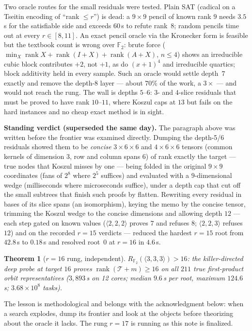 \documentclass[11pt]{article}
\newtheorem{theorem}{Theorem}
\theoremstyle{definition}
\newcommand{\F}{\mathbb{F}_2}
\newcommand{\T}{\mathcal{T}}
\newcommand{\rk}{\operatorname{rank}}
\begin{document}
Two oracle routes for the small residuals were tested. Plain SAT
(cadical on a Tseitin encoding of ``rank $\le r$'') is dead: a $9\times 9$
pencil of known rank $9$ needs $3.5$\,s for the satisfiable side and
exceeds $60$\,s to refute rank~$8$; random pencils time out at every
$r\in[8,11]$. An exact pencil oracle via the Kronecker form is feasible
but the textbook count is wrong over $\F$: brute force
($\min_X \rk X + \rk(I{+}X) + \rk(A{+}X)$, $n\le 4$) shows an irreducible
cubic block contributes $+2$, not $+1$, as do $(x+1)^4$ and irreducible
quartics; block additivity held in every sample. Such an oracle would
settle depth~$7$ exactly and remove the depth-$8$ layer --- about $70\%$
of the work, a $3\times$ --- and would not reach the rung. The wall is
depths $5$--$6$: $3$- and $4$-slice residuals that must be proved to have
rank $10$--$11$, where Koszul caps at $13$ but fails on the hard
instances and no cheap exact method is in sight.

\textbf{Standing verdict (superseded the same day).} The paragraph
above was written before the frontier was examined directly. Dumping
the depth-5/6 residuals showed them to be \emph{concise} $3\times 6\times 6$
and $4\times 6\times 6$ tensors (common kernels of dimension $3$, row and
column spans $6$) of rank exactly the target --- true nodes that Koszul
misses by one --- being folded in the original $9\times 9$ coordinates
(fans of $2^8$ where $2^5$ suffices) and evaluated with a $9$-dimensional
wedge (milliseconds where microseconds suffice), under a depth cap that
cut off the small subtrees that finish such proofs by flatten. Rewriting
every residual in bases of its slice spans (an isomorphism), keying the
memo by the concise tensor, trimming the Koszul wedge to the concise
dimensions and allowing depth $12$ --- each step gated on known values
($\langle 2,2,2\rangle$ proves $7$ and refuses $8$; $\langle 2,2,3\rangle$
refuses $12$) and on the recorded $r=15$ verdicts --- reduced the hardest
$r=15$ root from $42.8$\,s to $0.18$\,s and resolved root~$0$ at $r=16$
in $4.6$\,s.

\begin{theorem}[$r=16$ rung, independent]
$R_{\F}(\langle 3,3,3\rangle) > 16$: the killer-directed deep probe at
target $16$ proves $\rk(\T+m) \ge 16$ on all $211$ true first-product
orbit representatives ($3{,}893$\,s on 12 cores; median $9.6$\,s per
root, maximum $124.6$\,s; $3.68\times 10^8$ tasks).
\end{theorem}

The lesson is methodological and belongs with the acknowledgment below:
when a search explodes, dump its frontier and look at the objects before
theorizing about the oracle it lacks. The rung $r=17$ is running as this
note is finalized.
\end{document}

